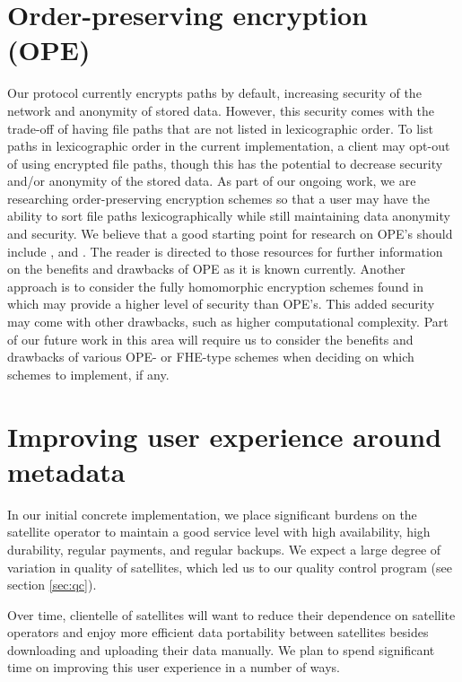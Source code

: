 \documentclass[11pt,fleqn,openany]{book}
\begin{document}
\section{Order-preserving encryption (OPE)}\label{section:OPE}

Our protocol currently encrypts paths by default,
increasing security of the network and anonymity of stored data.
However, this security comes with the trade-off of having file paths
that are not listed in lexicographic order.
To list paths in lexicographic order in the current implementation,
a client may opt-out of using encrypted file paths,
though this has the potential to decrease security
and/or anonymity of the stored data.
As part of our ongoing work,
we are researching
order-preserving encryption schemes
\cite{Agrawal:2004:OPE:1007568.1007632} so that a user may have
the ability to sort file paths lexicographically
while still maintaining data anonymity and security.
We believe that a good starting point for research on OPE's
should include \cite{7815719}, and \cite{10.1007/978-3-642-22792-9_33}.
The reader is directed to those resources for further information
on the benefits and drawbacks of OPE as it is known currently.
Another approach is to consider the fully
homomorphic encryption schemes found in \cite{gentry2015fully}
which may provide a higher level of security than OPE's.
This added security may come with other drawbacks,
such as higher computational complexity.
Part of our future work in this area will require us to consider
the benefits and drawbacks of various OPE- or FHE-type schemes
when deciding on which schemes to implement, if any.

\section{Improving user experience around metadata}\label{sec:distributed-metadata}

In our initial concrete implementation, we place significant burdens on the
satellite operator to maintain a good service level with high availability,
high durability, regular payments, and regular backups. We expect a large
degree of variation in quality of satellites, which led us to our quality
control program (see section \ref{sec:qc}).

Over time, clientelle of satellites will want to reduce their dependence on satellite
operators and enjoy more efficient data portability between satellites besides
downloading and uploading their data manually. We plan to spend significant time
on improving this user experience in a number of ways.
\end{document}
